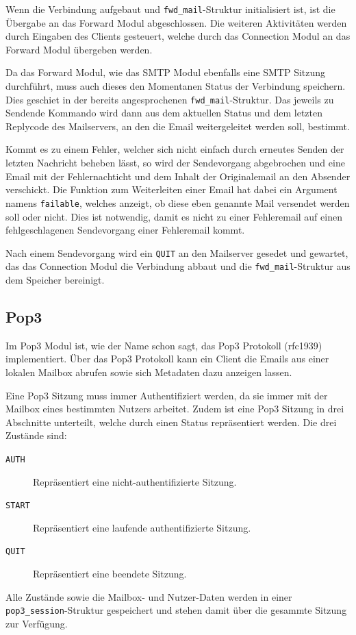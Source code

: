\documentclass[final,a4paper,11pt,notitlepage,halfparskip]{scrreprt}
\begin{document}
Wenn die Verbindung aufgebaut und \texttt{fwd\_mail}-Struktur initialisiert ist,
ist die Übergabe an das Forward Modul abgeschlossen. Die weiteren Aktivitäten
werden durch Eingaben des Clients gesteuert, welche durch das Connection Modul
an das Forward Modul übergeben werden.

Da das Forward Modul, wie das SMTP Modul ebenfalls eine SMTP Sitzung
durchführt, muss auch dieses den Momentanen Status der Verbindung speichern.
Dies geschiet in der bereits angesprochenen \texttt{fwd\_mail}-Struktur. Das
jeweils zu Sendende Kommando wird dann aus dem aktuellen Status und dem letzten
Replycode des Mailservers, an den die Email weitergeleitet werden soll,
bestimmt.

Kommt es zu einem Fehler, welcher sich nicht einfach durch erneutes Senden der
letzten Nachricht beheben lässt, so wird der Sendevorgang abgebrochen und eine
Email mit der Fehlernachticht und dem Inhalt der Originalemail an den Absender
verschickt. Die Funktion zum Weiterleiten einer Email hat dabei ein Argument
namens \texttt{failable}, welches anzeigt, ob diese eben genannte Mail versendet
werden soll oder nicht. Dies ist notwendig, damit es nicht zu einer Fehleremail
auf einen fehlgeschlagenen Sendevorgang einer Fehleremail kommt.

Nach einem Sendevorgang wird ein \texttt{QUIT} an den Mailserver gesedet und
gewartet, das das Connection Modul die Verbindung abbaut und die
\texttt{fwd\_mail}-Struktur aus dem Speicher bereinigt.


\subsection{Pop3}
Im Pop3 Modul ist, wie der Name schon sagt, das Pop3 Protokoll (rfc1939)
implementiert. Über das Pop3 Protokoll kann ein Client die Emails aus einer
lokalen Mailbox abrufen sowie sich Metadaten dazu anzeigen lassen.

Eine Pop3 Sitzung muss immer Authentifiziert werden, da sie immer mit der
Mailbox eines bestimmten Nutzers arbeitet. Zudem ist eine Pop3 Sitzung in drei
Abschnitte unterteilt, welche durch einen Status repräsentiert werden. Die drei
Zustände sind:
\begin{description}
    \item[\texttt{AUTH}] Repräsentiert eine nicht-authentifizierte Sitzung.
    \item[\texttt{START}] Repräsentiert eine laufende authentifizierte Sitzung.
    \item[\texttt{QUIT}] Repräsentiert eine beendete Sitzung.	
\end{description}
Alle Zustände sowie die Mailbox- und Nutzer-Daten werden in einer
\texttt{pop3\_session}-Struktur gespeichert und stehen damit über die gesammte
Sitzung zur Verfügung. 
\end{document}

